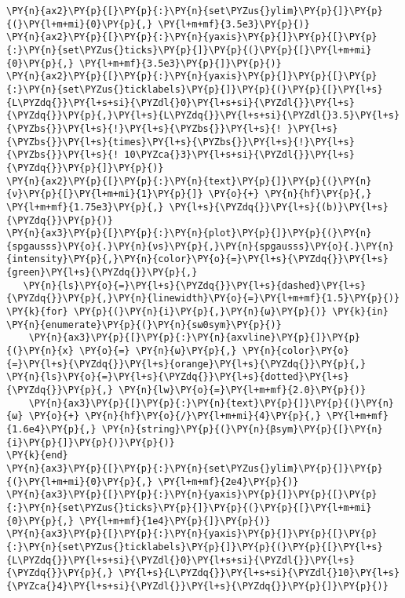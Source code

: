 \begin{Verbatim}[commandchars=\\\{\}]
\PY{n}{ax2}\PY{p}{[}\PY{p}{:}\PY{n}{set\PYZus{}ylim}\PY{p}{]}\PY{p}{(}\PY{l+m+mi}{0}\PY{p}{,} \PY{l+m+mf}{3.5e3}\PY{p}{)}
\PY{n}{ax2}\PY{p}{[}\PY{p}{:}\PY{n}{yaxis}\PY{p}{]}\PY{p}{[}\PY{p}{:}\PY{n}{set\PYZus{}ticks}\PY{p}{]}\PY{p}{(}\PY{p}{[}\PY{l+m+mi}{0}\PY{p}{,} \PY{l+m+mf}{3.5e3}\PY{p}{]}\PY{p}{)}
\PY{n}{ax2}\PY{p}{[}\PY{p}{:}\PY{n}{yaxis}\PY{p}{]}\PY{p}{[}\PY{p}{:}\PY{n}{set\PYZus{}ticklabels}\PY{p}{]}\PY{p}{(}\PY{p}{[}\PY{l+s}{L\PYZdq{}}\PY{l+s+si}{\PYZdl{}0}\PY{l+s+si}{\PYZdl{}}\PY{l+s}{\PYZdq{}}\PY{p}{,}\PY{l+s}{L\PYZdq{}}\PY{l+s+si}{\PYZdl{}3.5}\PY{l+s}{\PYZbs{}}\PY{l+s}{!}\PY{l+s}{\PYZbs{}}\PY{l+s}{! }\PY{l+s}{\PYZbs{}}\PY{l+s}{times}\PY{l+s}{\PYZbs{}}\PY{l+s}{!}\PY{l+s}{\PYZbs{}}\PY{l+s}{! 10\PYZca{}3}\PY{l+s+si}{\PYZdl{}}\PY{l+s}{\PYZdq{}}\PY{p}{]}\PY{p}{)}
\PY{n}{ax2}\PY{p}{[}\PY{p}{:}\PY{n}{text}\PY{p}{]}\PY{p}{(}\PY{n}{ν}\PY{p}{[}\PY{l+m+mi}{1}\PY{p}{]} \PY{o}{+} \PY{n}{hf}\PY{p}{,} \PY{l+m+mf}{1.75e3}\PY{p}{,} \PY{l+s}{\PYZdq{}}\PY{l+s}{(b)}\PY{l+s}{\PYZdq{}}\PY{p}{)}
\PY{n}{ax3}\PY{p}{[}\PY{p}{:}\PY{n}{plot}\PY{p}{]}\PY{p}{(}\PY{n}{spgausss}\PY{o}{.}\PY{n}{νs}\PY{p}{,}\PY{n}{spgausss}\PY{o}{.}\PY{n}{intensity}\PY{p}{,}\PY{n}{color}\PY{o}{=}\PY{l+s}{\PYZdq{}}\PY{l+s}{green}\PY{l+s}{\PYZdq{}}\PY{p}{,}
   \PY{n}{ls}\PY{o}{=}\PY{l+s}{\PYZdq{}}\PY{l+s}{dashed}\PY{l+s}{\PYZdq{}}\PY{p}{,}\PY{n}{linewidth}\PY{o}{=}\PY{l+m+mf}{1.5}\PY{p}{)}
\PY{k}{for} \PY{p}{(}\PY{n}{i}\PY{p}{,}\PY{n}{ω}\PY{p}{)} \PY{k}{in} \PY{n}{enumerate}\PY{p}{(}\PY{n}{sω0sym}\PY{p}{)}
    \PY{n}{ax3}\PY{p}{[}\PY{p}{:}\PY{n}{axvline}\PY{p}{]}\PY{p}{(}\PY{n}{x} \PY{o}{=} \PY{n}{ω}\PY{p}{,} \PY{n}{color}\PY{o}{=}\PY{l+s}{\PYZdq{}}\PY{l+s}{orange}\PY{l+s}{\PYZdq{}}\PY{p}{,} \PY{n}{ls}\PY{o}{=}\PY{l+s}{\PYZdq{}}\PY{l+s}{dotted}\PY{l+s}{\PYZdq{}}\PY{p}{,} \PY{n}{lw}\PY{o}{=}\PY{l+m+mf}{2.0}\PY{p}{)}
    \PY{n}{ax3}\PY{p}{[}\PY{p}{:}\PY{n}{text}\PY{p}{]}\PY{p}{(}\PY{n}{ω} \PY{o}{+} \PY{n}{hf}\PY{o}{/}\PY{l+m+mi}{4}\PY{p}{,} \PY{l+m+mf}{1.6e4}\PY{p}{,} \PY{n}{string}\PY{p}{(}\PY{n}{βsym}\PY{p}{[}\PY{n}{i}\PY{p}{]}\PY{p}{)}\PY{p}{)}
\PY{k}{end}
\PY{n}{ax3}\PY{p}{[}\PY{p}{:}\PY{n}{set\PYZus{}ylim}\PY{p}{]}\PY{p}{(}\PY{l+m+mi}{0}\PY{p}{,} \PY{l+m+mf}{2e4}\PY{p}{)}
\PY{n}{ax3}\PY{p}{[}\PY{p}{:}\PY{n}{yaxis}\PY{p}{]}\PY{p}{[}\PY{p}{:}\PY{n}{set\PYZus{}ticks}\PY{p}{]}\PY{p}{(}\PY{p}{[}\PY{l+m+mi}{0}\PY{p}{,} \PY{l+m+mf}{1e4}\PY{p}{]}\PY{p}{)}
\PY{n}{ax3}\PY{p}{[}\PY{p}{:}\PY{n}{yaxis}\PY{p}{]}\PY{p}{[}\PY{p}{:}\PY{n}{set\PYZus{}ticklabels}\PY{p}{]}\PY{p}{(}\PY{p}{[}\PY{l+s}{L\PYZdq{}}\PY{l+s+si}{\PYZdl{}0}\PY{l+s+si}{\PYZdl{}}\PY{l+s}{\PYZdq{}}\PY{p}{,} \PY{l+s}{L\PYZdq{}}\PY{l+s+si}{\PYZdl{}10}\PY{l+s}{\PYZca{}4}\PY{l+s+si}{\PYZdl{}}\PY{l+s}{\PYZdq{}}\PY{p}{]}\PY{p}{)}

\end{Verbatim}
